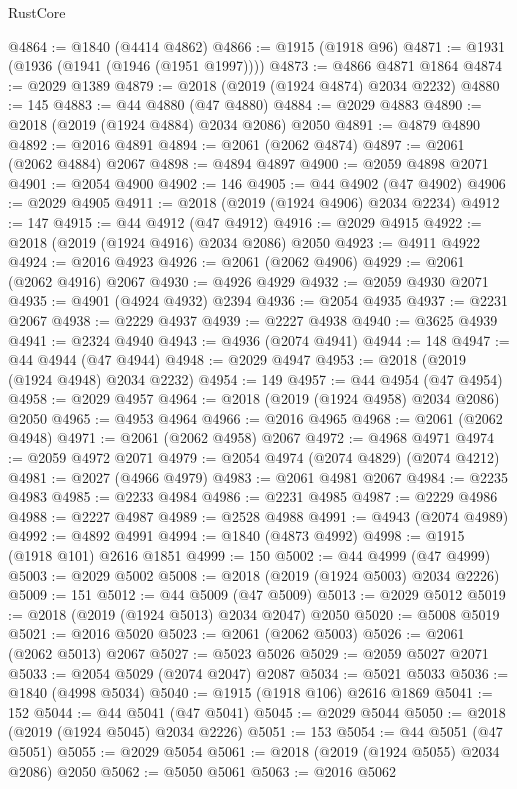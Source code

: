 \begin{lexlean}{RustCore}
\begin{coremodule}
@4864 := @1840 (@4414 @4862)
@4866 := @1915 (@1918 @96)
@4871 := @1931 (@1936 (@1941 (@1946 (@1951 @1997))))
@4873 := @4866 @4871 @1864
@4874 := @2029 @1389
@4879 := @2018 (@2019 (@1924 @4874) @2034 @2232)
@4880 := 145
@4883 := @44 @4880 (@47 @4880)
@4884 := @2029 @4883
@4890 := @2018 (@2019 (@1924 @4884) @2034 @2086) @2050
@4891 := @4879 @4890
@4892 := @2016 @4891
@4894 := @2061 (@2062 @4874)
@4897 := @2061 (@2062 @4884) @2067
@4898 := @4894 @4897
@4900 := @2059 @4898 @2071
@4901 := @2054 @4900
@4902 := 146
@4905 := @44 @4902 (@47 @4902)
@4906 := @2029 @4905
@4911 := @2018 (@2019 (@1924 @4906) @2034 @2234)
@4912 := 147
@4915 := @44 @4912 (@47 @4912)
@4916 := @2029 @4915
@4922 := @2018 (@2019 (@1924 @4916) @2034 @2086) @2050
@4923 := @4911 @4922
@4924 := @2016 @4923
@4926 := @2061 (@2062 @4906)
@4929 := @2061 (@2062 @4916) @2067
@4930 := @4926 @4929
@4932 := @2059 @4930 @2071
@4935 := @4901 (@4924 @4932) @2394
@4936 := @2054 @4935
@4937 := @2231 @2067
@4938 := @2229 @4937
@4939 := @2227 @4938
@4940 := @3625 @4939
@4941 := @2324 @4940
@4943 := @4936 (@2074 @4941)
@4944 := 148
@4947 := @44 @4944 (@47 @4944)
@4948 := @2029 @4947
@4953 := @2018 (@2019 (@1924 @4948) @2034 @2232)
@4954 := 149
@4957 := @44 @4954 (@47 @4954)
@4958 := @2029 @4957
@4964 := @2018 (@2019 (@1924 @4958) @2034 @2086) @2050
@4965 := @4953 @4964
@4966 := @2016 @4965
@4968 := @2061 (@2062 @4948)
@4971 := @2061 (@2062 @4958) @2067
@4972 := @4968 @4971
@4974 := @2059 @4972 @2071
@4979 := @2054 @4974 (@2074 @4829) (@2074 @4212)
@4981 := @2027 (@4966 @4979)
@4983 := @2061 @4981 @2067
@4984 := @2235 @4983
@4985 := @2233 @4984
@4986 := @2231 @4985
@4987 := @2229 @4986
@4988 := @2227 @4987
@4989 := @2528 @4988
@4991 := @4943 (@2074 @4989)
@4992 := @4892 @4991
@4994 := @1840 (@4873 @4992)
@4998 := @1915 (@1918 @101) @2616 @1851
@4999 := 150
@5002 := @44 @4999 (@47 @4999)
@5003 := @2029 @5002
@5008 := @2018 (@2019 (@1924 @5003) @2034 @2226)
@5009 := 151
@5012 := @44 @5009 (@47 @5009)
@5013 := @2029 @5012
@5019 := @2018 (@2019 (@1924 @5013) @2034 @2047) @2050
@5020 := @5008 @5019
@5021 := @2016 @5020
@5023 := @2061 (@2062 @5003)
@5026 := @2061 (@2062 @5013) @2067
@5027 := @5023 @5026
@5029 := @2059 @5027 @2071
@5033 := @2054 @5029 (@2074 @2047) @2087
@5034 := @5021 @5033
@5036 := @1840 (@4998 @5034)
@5040 := @1915 (@1918 @106) @2616 @1869
@5041 := 152
@5044 := @44 @5041 (@47 @5041)
@5045 := @2029 @5044
@5050 := @2018 (@2019 (@1924 @5045) @2034 @2226)
@5051 := 153
@5054 := @44 @5051 (@47 @5051)
@5055 := @2029 @5054
@5061 := @2018 (@2019 (@1924 @5055) @2034 @2086) @2050
@5062 := @5050 @5061
@5063 := @2016 @5062

\end{coremodule}
\end{lexlean}
